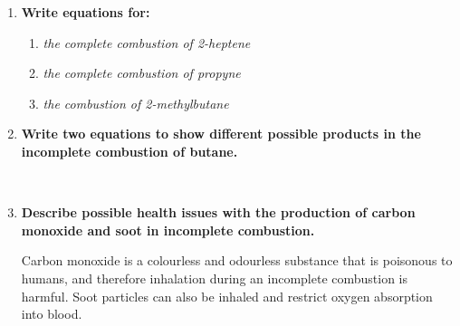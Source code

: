 \documentclass{report}
\begin{document}
\begin{enumerate}
\begin{enumerate}
					\begin{center}
					\end{center}
			\end{enumerate}

		\item \textbf{Write equations for:}
		
			\begin{enumerate}
				\item \textit{the complete combustion of 2-heptene}

					\begin{center}
					\end{center}

				\item \textit{the complete combustion of propyne}

					\begin{center}
					\end{center}

				\item \textit{the combustion of 2-methylbutane}

					\begin{center}
					\end{center}
			\end{enumerate}

		\item \textbf{Write two equations to show different possible products in the incomplete combustion of butane.}

			\begin{center}
			\end{center}
			\\
			\begin{center}
			\end{center}
			
		\item \textbf{Describe possible health issues with the production of carbon monoxide and soot in incomplete combustion.}

			Carbon monoxide is a colourless and odourless substance that is poisonous to humans, and therefore inhalation during an incomplete combustion is harmful. Soot particles can also be inhaled and restrict oxygen absorption into blood.


\end{enumerate}
\end{document}
